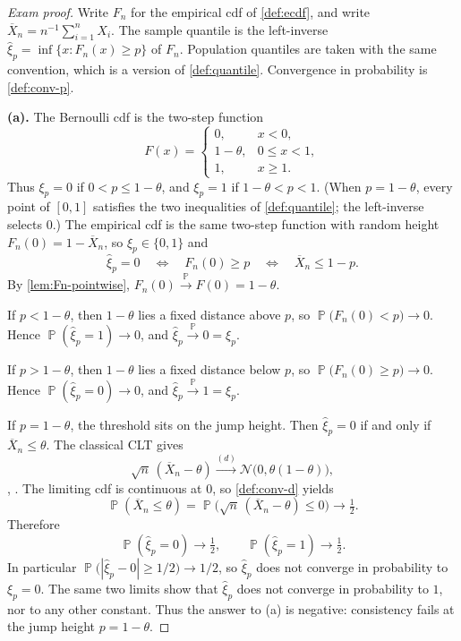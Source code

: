 \documentclass[11pt,a4paper]{article}
\DeclareMathOperator{\Pbb}{\mathbb{P}}
\begin{document}
\begin{proof}[Exam proof]
Write \(F_n\) for the empirical cdf of \cref{def:ecdf}, and write \(\overline{X}_n=n^{-1}\sum_{i=1}^{n}X_i\). The sample quantile is the left-inverse \(\hat{\xi}_p=\inf\{x:F_n(x)\ge p\}\) of \(F_n\). Population quantiles are taken with the same convention, which is a version of \cref{def:quantile}. Convergence in probability is \cref{def:conv-p}.

\textbf{(a).}
The Bernoulli cdf is the two-step function
\[
F(x)
=
\begin{cases}
0, & x<0,\\
1-\theta, & 0\le x<1,\\
1, & x\ge 1.
\end{cases}
\]
Thus \(\xi_p=0\) if \(0<p\le 1-\theta\), and \(\xi_p=1\) if \(1-\theta<p<1\). (When \(p=1-\theta\), every point of \([0,1]\) satisfies the two inequalities of \cref{def:quantile}; the left-inverse selects \(0\).) The empirical cdf is the same two-step function with random height \(F_n(0)=1-\overline{X}_n\), so \(\hat{\xi}_p\in\{0,1\}\) and
\[
\hat{\xi}_p=0
\quad\Longleftrightarrow\quad
F_n(0)\ge p
\quad\Longleftrightarrow\quad
\overline{X}_n\le 1-p.
\]
By \cref{lem:Fn-pointwise}, \(F_n(0)\xrightarrow{\Pbb}F(0)=1-\theta\).

If \(p<1-\theta\), then \(1-\theta\) lies a fixed distance above \(p\), so \(\Pbb\bigl(F_n(0)<p\bigr)\to 0\). Hence \(\Pbb(\hat{\xi}_p=1)\to 0\), and \(\hat{\xi}_p\xrightarrow{\Pbb}0=\xi_p\).

If \(p>1-\theta\), then \(1-\theta\) lies a fixed distance below \(p\), so \(\Pbb\bigl(F_n(0)\ge p\bigr)\to 0\). Hence \(\Pbb(\hat{\xi}_p=0)\to 0\), and \(\hat{\xi}_p\xrightarrow{\Pbb}1=\xi_p\).

If \(p=1-\theta\), the threshold sits on the jump height. Then \(\hat{\xi}_p=0\) if and only if \(\overline{X}_n\le\theta\). The classical CLT gives
\[
\sqrt{n}\,(\overline{X}_n-\theta)
\xrightarrow{(d)}
\mathcal{N}\bigl(0,\theta(1-\theta)\bigr),
\]
\citep[\S5.3]{hogg2019}, \citep[Theorem~3.4.1]{durrett2010}. The limiting cdf is continuous at \(0\), so \cref{def:conv-d} yields
\[
\Pbb(\overline{X}_n\le\theta)
=
\Pbb\bigl(\sqrt{n}\,(\overline{X}_n-\theta)\le 0\bigr)
\to
\tfrac12.
\]
Therefore
\[
\Pbb(\hat{\xi}_p=0)\to\tfrac12,
\qquad
\Pbb(\hat{\xi}_p=1)\to\tfrac12.
\]
In particular \(\Pbb\bigl(|\hat{\xi}_p-0|\ge 1/2\bigr)\to 1/2\), so \(\hat{\xi}_p\) does not converge in probability to \(\xi_p=0\). The same two limits show that \(\hat{\xi}_p\) does not converge in probability to \(1\), nor to any other constant. Thus the answer to (a) is negative: consistency fails at the jump height \(p=1-\theta\).


\end{proof}
\end{document}
